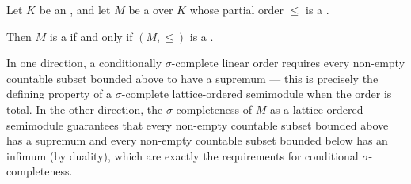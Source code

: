 \begin{proposition} \label{proposition:sigma_complete_lattice_ordered_semimodule_with_total_order_coincides_with_conditionally_sigma_complete_linear_order}
Let $K$ be an , and let $M$ be a  over $K$ whose partial order $\leq$ is a .

Then $M$ is a  if and only if $(M, \leq)$ is a .

In one direction, a conditionally $\sigma$-complete linear order requires every non-empty countable subset bounded above to have a supremum — this is precisely the defining property of a $\sigma$-complete lattice-ordered semimodule when the order is total. In the other direction, the $\sigma$-completeness of $M$ as a lattice-ordered semimodule guarantees that every non-empty countable subset bounded above has a supremum and every non-empty countable subset bounded below has an infimum (by duality), which are exactly the requirements for conditional $\sigma$-completeness.
\end{proposition}
